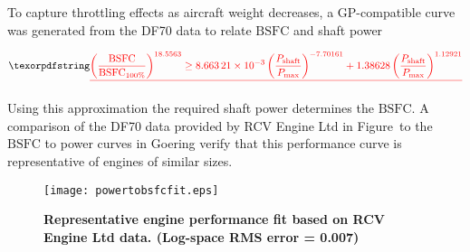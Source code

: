 \DIFdelend To capture throttling effects as aircraft weight decreases, a GP-compatible curve was generated from the DF70 data to relate $\text{BSFC}$ and shaft power\DIFdelbegin \DIFdel{, 
}%

\begin{displaymath}
    \DIFdel{\label{e:rpmtobsfc}
    \left( \frac{\text{BSFC}}{\text{BSFC}_{100\%}} \right)^{18.5563} \geq \num{8.66321d-3}\left( \frac{P_{\text{shaft}}}{P_{\text{max}}}\right)^{-7.70161} + 1.38628\left( \frac{P_{\text{shaft}}}{P_{\text{max}}} \right)^{1.12921} }\\
\end{displaymath}

\DIFdelend \DIFaddbegin {}\DIFaddend Using this approximation the required shaft power determines the $\text{BSFC}$.
A comparison of the \DIFdelbegin {}\DIFdelend DF70 data provided by RCV Engine Ltd in Figure~\DIFdelbegin \DIFdel{\ref{f:powervsweightfit} }\DIFdelend \DIFaddbegin \DIFadd{\ref{f:powertobsfc} }\DIFaddend to the $\text{BSFC}$ to power curves in Goering\cite{bsfcperf} verify that this performance curve is representative of engines of similar sizes. 

\DIFaddbegin 


\DIFaddend \begin{figure}[H]
	\begin{center}
	\DIFdelbeginFL %
\DIFdelendFL \DIFaddbeginFL \texttt{[image: powertobsfcfit.eps]}
    \DIFaddendFL \caption{\textbf{Representative engine performance fit based on RCV Engine Ltd data.  (Log-space RMS error = 0.007) }}
	\DIFdelbeginFL %
\DIFdelendFL \DIFaddbeginFL \label{f:powertobsfc}
	\DIFaddendFL \end{center}
\end{figure}

